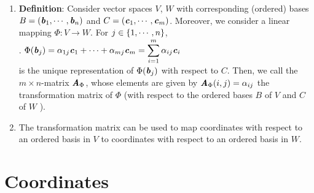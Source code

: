\begin{enumerate}
    \item \textbf{Definition}: Consider vector spaces $V$, $W$ with corresponding (ordered) bases $B = (\text{\textbf{\textit{b}}}_1, \cdots , \text{\textbf{\textit{b}}}_n)$ and $C = (\text{\textbf{\textit{c}}}_1, \cdots , \text{\textbf{\textit{c}}}_m)$. 
    Moreover, we consider a linear mapping $\Phi : V \to W$. 
    For $j \in \left\{1, \cdots , n\right\}$,
    \hfill \cite{mfml/book/mml/Deisenroth-Faisal-Ong}
    \\
    .\hfill
    $
        \Phi(\text{\textbf{\textit{b}}}_j ) = \alpha _{1j} \text{\textbf{\textit{c}}}_1 + \cdots + \alpha _{mj} \text{\textbf{\textit{c}}}_m 
        = \displaystyle\sum^m_{i=1} \alpha _{ij} \text{\textbf{\textit{c}}}_i
    $
    \hfill \cite{mfml/book/mml/Deisenroth-Faisal-Ong}
    \\
    is the unique representation of $\Phi(\text{\textbf{\textit{b}}}_j )$ with respect to $C$. 
    Then, we call the $m \times n$-matrix $\text{\textbf{\textit{A}}}_\Phi$, whose elements are given by $\text{\textbf{\textit{A}}}_\Phi(i, j) = \alpha_{ij}$ the transformation matrix of $\Phi$ (with respect to the ordered bases $B$ of $V$ and $C$ of $W$  ).
    \hfill \cite{mfml/book/mml/Deisenroth-Faisal-Ong}

    \item The transformation matrix can be used to map coordinates with respect to an ordered basis in $V$ to coordinates with respect to an ordered basis in $W$.
    \hfill \cite{mfml/book/mml/Deisenroth-Faisal-Ong}
\end{enumerate}






\section{Coordinates}

